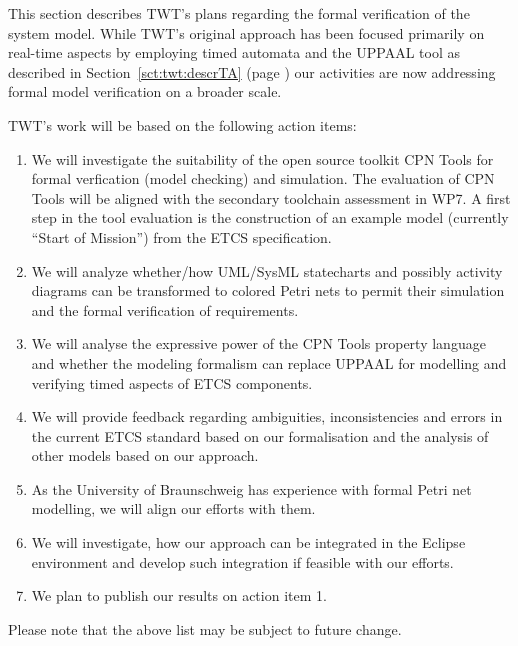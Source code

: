 
This section describes TWT's plans regarding the formal verification
of the system model. While TWT's original approach has been focused
primarily on real-time aspects by employing timed automata and the
UPPAAL tool as described in Section~\ref{sct:twt:descrTA} (page
\pageref{sct:twt:descrTA}) our activities are now addressing formal
model verification on a broader scale.

TWT's work will be based on the following action items:
\begin{enumerate}
\item We will investigate the suitability of the open source toolkit
  CPN Tools\cite{CPNTools} for formal verfication (model checking) and
  simulation. The evaluation of CPN Tools will be aligned with the
  secondary toolchain assessment in WP7. A first step in the tool
  evaluation is the construction of an example model (currently
  ``Start of Mission'') from the ETCS specification.
  \item We will analyze whether/how UML/SysML statecharts and possibly
activity diagrams can be transformed to colored Petri nets to permit
their simulation and the formal verification of requirements.
  \item We will analyse the expressive power of the CPN Tools property
  language and whether the modeling formalism can replace UPPAAL for
  modelling and verifying timed aspects of ETCS components.
  \item We will provide feedback regarding ambiguities,
  inconsistencies and errors in the current ETCS standard based on our
  formalisation and the analysis of other models based on our
  approach.
  \item As the University of Braunschweig has experience with formal
  Petri net modelling, we will align our efforts with them.
  \item We will investigate, how our approach can be integrated in the
Eclipse environment and develop such integration if feasible with our
efforts.
  \item We plan to publish our results on action item 1.
\end{enumerate}

Please note that the above list may be subject to future change.
